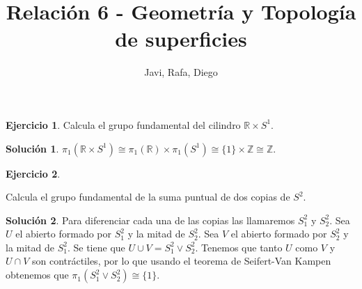 \documentclass{article}
\theoremstyle{plain}
\theoremstyle{definition}
\newtheorem{exercise}{Ejercicio}
\newtheorem*{sol*}{Solución}
\newcommand{\R}{\mathbb{R}}
\newcommand{\Z}{\mathbb{Z}}
\begin{document}
\title{Relación 6 - Geometría y Topología de superficies }
\author{Javi, Rafa, Diego}
\maketitle

\begin{exercise}

Calcula el grupo fundamental del cilindro $\mathbb{R}\times S^1$.

\end{exercise}
\begin{sol*}
$\pi_1(\mathbb{R}\times S^1)\cong\pi_1(\R)\times\pi_1(S^1)\cong\{1\}\times\Z\cong\Z.$
\end{sol*}

\newpage


\begin{exercise}\label{2}

Calcula el grupo fundamental de la suma puntual de dos copias de $S^2$.

\end{exercise}
\begin{sol*}
Para diferenciar cada una de las copias las llamaremos $S^2_1$ y $S^2_2$. Sea $U$ el abierto formado por $S^2_1$ y la mitad de $S^2_2$. Sea $V$ el abierto formado por $S^2_2$ y la mitad de $S^2_1$. Se tiene que $U\cup V=S^2_1\vee S^2_2$. Tenemos que tanto $U$ como $V$ y $U\cap V$ son contráctiles, por lo que usando el teorema de Seifert-Van Kampen obtenemos que $\pi_1(S^2_1\vee S^2_2)\cong\{1\}$.
\end{sol*}

\newpage
\end{document}
